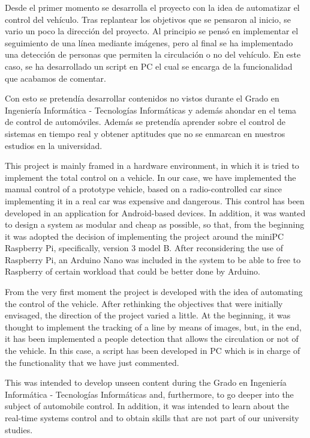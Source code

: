 \documentclass{pclass}
\begin{document}
Desde el primer momento se desarrolla el proyecto con la idea de automatizar el control del vehículo. Tras replantear los objetivos que se pensaron al inicio, se vario un poco la dirección del proyecto. Al principio se pensó en implementar el seguimiento de una línea mediante imágenes, pero al final se ha implementado una detección de personas que permiten la circulación o no del vehículo. En este caso, se ha desarrollado un script en PC el cual se encarga de la funcionalidad que acabamos de comentar.



Con esto se pretendía desarrollar contenidos no vistos durante el Grado en Ingeniería Informática - Tecnologías Informáticas y además ahondar en el tema de control de automóviles. Además se pretendía aprender sobre el control de sistemas en tiempo real y obtener aptitudes que no se enmarcan en nuestros estudios en la universidad.




This project is mainly framed in a hardware environment, in which it is tried to implement the total control on a vehicle. In our case, we have implemented the manual control of a prototype vehicle, based on a radio-controlled car since implementing it in a real car was expensive and dangerous. This control has been developed in an application for Android-based devices. In addition, it was wanted to design a system as modular and cheap as possible, so that, from the beginning it was adopted the decision of implementing the project around the miniPC Raspberry Pi, specifically, version 3 model B. After reconsidering the use of Raspberry Pi, an Arduino Nano was included in the system to be able to free to Raspberry of certain workload that could be better done by Arduino.


From the very first moment the project is developed with the idea of automating the control of the vehicle. After rethinking the objectives that were initially envisaged, the direction of the project varied a little. At the beginning, it was thought to implement the tracking of a line by means of images, but, in the end, it has been implemented a people detection that allows the circulation or not of the vehicle. 
In this case, a script has been developed in PC which is in charge of the functionality that we have just commented.


This was intended to develop unseen content during the Grado en Ingeniería Informática - Tecnologías Informáticas and, furthermore, to go deeper into the subject of automobile control. 
In addition, it was intended to learn about the real-time systems control and to obtain skills that are not part of our university studies.
\end{document}
